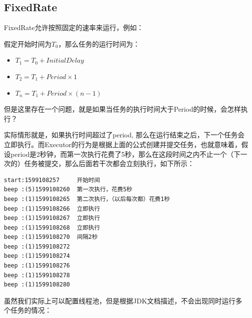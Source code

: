 \documentclass[12pt]{article}
\begin{document}
\subsection{FixedRate}\label{fixedrate}

FixedRate允许按照固定的速率来运行，例如：

\begin{Shaded}
\begin{Highlighting}[]
\OperatorTok{(()} \OperatorTok{{-}\textgreater{}} \OperatorTok{\{}
            \OperatorTok{(}\OperatorTok{);}
        \OperatorTok{\},} \OperatorTok{,} \OperatorTok{,} \OperatorTok{);} 
\end{Highlighting}
\end{Shaded}

假定开始时间为\(T_0\)，那么任务的运行时间为：

\begin{itemize}
\tightlist
\item
  \(T_1 = T_0 + InitialDelay\)
\item
  \(T_2 = T_1 + Period \times 1\)
\item
  \(T_n = T_1 + Period \times (n - 1)\)
\end{itemize}

但是这里存在一个问题，就是如果当任务的执行时间大于Period的时候，会怎样执行？

实际情形就是，如果执行时间超过了period, 那么在运行结束之后，下一个任务会立即执行。而Executor的行为是根据上面的公式创建并提交任务，也就意味着，假设period是2秒钟，而第一次执行花费了5秒，那么在这段时间之内不止一个（下一次的）任务被提交，那么后面若干次都会立刻执行，如下所示：

\begin{verbatim}
start:1599108257     开始时间
beep :(5)1599108260  第一次执行，花费5秒
beep :(1)1599108265  第二次执行，（以后每次都）花费1秒
beep :(1)1599108266  立即执行
beep :(1)1599108267  立即执行
beep :(1)1599108268  立即执行
beep :(1)1599108270  间隔2秒
beep :(1)1599108272
beep :(1)1599108274
beep :(1)1599108276
beep :(1)1599108278
beep :(1)1599108280
\end{verbatim}

虽然我们实际上可以配置线程池，但是根据JDK文档描述，不会出现同时运行多个任务的情况：
\end{document}
